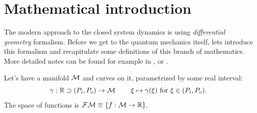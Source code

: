 \chapter{Mathematical introduction}
\label{chap:mathIntro}
The modern approach to the closed system dynamics is using \emph{differential geometry} formalism. Before we get to the quantum mechanics itself, lets introduce this formalism and recapitulate some definitions of this branch of mathematics. More detailed notes can be found for example in \citep{fecko}, or .

Let's have a manifold $\mathcal{M}$ and curves on it, parametrized by some real interval:
$$\gamma:\mathbb{R} \supset (P_i,P_o) \rightarrow \mathcal{M}\; \qquad \xi\mapsto \gamma(\xi) \text{  for } \xi \in (P_i,P_o) .$$ 
The space of functions is $\mathcal{FM}\equiv\{f:\mathcal{M}\rightarrow \mathbb{R}\}$.


